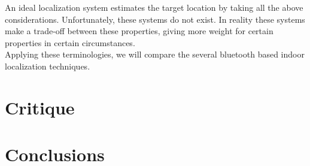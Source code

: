 \documentclass[12pt]{article}
\begin{document}
An ideal localization system estimates the target location by taking all the above considerations. Unfortunately, these systems do not exist. In reality these systems make a trade-off between these properties, giving more weight for certain properties in certain circumstances. \\

Applying these terminologies, we will compare the several bluetooth based indoor localization techniques.

\section{Critique}


\section{Conclusions}



\nocite{*}
\end{document}
